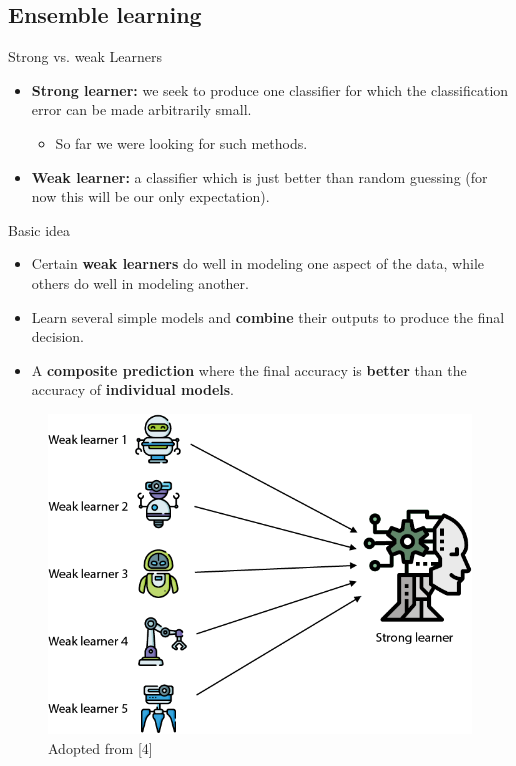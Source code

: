 \documentclass[serif, aspectratio=169]{beamer}
\begin{document}
\subsection{Ensemble learning}

\begin{frame}{Strong vs. weak Learners}
    \begin{itemize}
        \itemsep1em
        \justifying
        \item \textbf{Strong learner:} we seek to produce one classifier for which the classification error can be made arbitrarily small.
        \begin{itemize}
            \item So far we were looking for such methods.
        \end{itemize}
        \item \textbf{Weak learner:} a classifier which is just better than random guessing (for now this will be our only expectation).
    \end{itemize}
\end{frame}

\begin{frame}{Basic idea}
    \begin{itemize}
        \itemsep1em
        \justifying
        \item Certain \textbf{weak learners} do well in modeling one aspect of the data, while others do well in modeling another.
        \item Learn several simple models and \textbf{combine} their outputs to produce the final decision.
        \item A \textbf{composite prediction} where the final accuracy is \textbf{better} than the accuracy of \textbf{individual models}.
    \end{itemize}
    \endminipage \hfill
    \begin{figure}[!htb]
        \includegraphics[width=\linewidth]{pic/learners.png}
        {\scriptsize Adopted from [4]}
    \end{figure}
    \endminipage
\end{frame}
\end{document}
